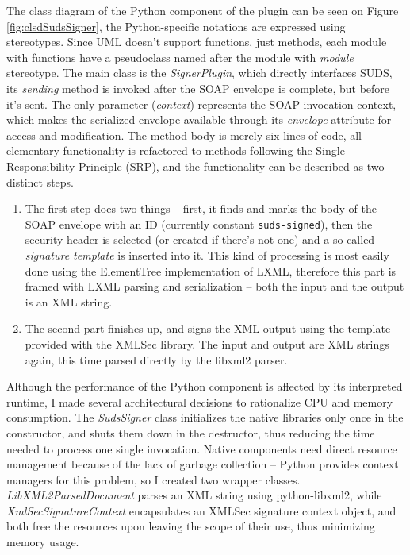The class diagram of the Python component of the plugin can be seen on Figure \ref{fig:clsdSudsSigner}, the Python-specific notations are expressed using stereotypes. Since UML doesn't support functions, just methods, each module with functions have a pseudoclass named after the module with \emph{module} stereotype. The main class is the \emph{SignerPlugin}, which directly interfaces SUDS, its \emph{sending} method is invoked after the SOAP envelope is complete, but before it's sent. The only parameter (\emph{context}) represents the SOAP invocation context, which makes the serialized envelope available through its \emph{envelope} attribute for access and modification. The method body is merely six lines of code, all elementary functionality is refactored to methods following the Single Responsibility Principle (SRP), and the functionality can be described as two distinct steps.

\begin{enumerate}
 \item The first step does two things -- first, it finds and marks the body of the SOAP envelope with an ID (currently constant \verb|suds-signed|), then the security header is selected (or created if there's not one) and a so-called \emph{signature template} is inserted into it. This kind of processing is most easily done using the ElementTree implementation of LXML, therefore this part is framed with LXML parsing and serialization -- both the input and the output is an XML string.
 \item The second part finishes up, and signs the XML output using the template provided with the XMLSec library. The input and output are XML strings again, this time parsed directly by the libxml2 parser.
\end{enumerate}

Although the performance of the Python component is affected by its interpreted runtime, I made several architectural decisions to rationalize CPU and memory consumption. The \emph{SudsSigner} class initializes the native libraries only once in the constructor, and shuts them down in the destructor, thus reducing the time needed to process one single invocation. Native components need direct resource management because of the lack of garbage collection -- Python provides context managers for this problem, so I created two wrapper classes. \emph{LibXML2ParsedDocument} parses an XML string using python-libxml2, while \emph{XmlSecSignatureContext} encapsulates an XMLSec signature context object, and both free the resources upon leaving the scope of their use, thus minimizing memory usage.

